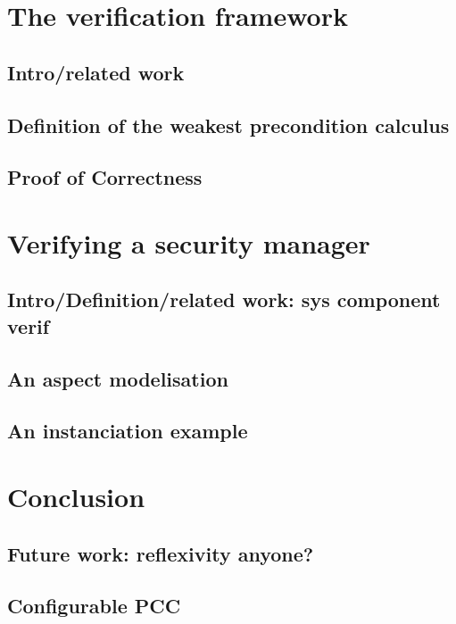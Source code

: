\documentclass[draft]{llncs}
\begin{document}
\section{The verification framework}
\subsection{Intro/related work}
\subsection{Definition of the weakest precondition calculus}
\subsection{Proof of Correctness}
%
\section{Verifying a security manager}
\subsection{Intro/Definition/related work: sys component verif}
\subsection{An aspect modelisation}
\subsection{An instanciation example}
\section{Conclusion}
\subsection{Future work: reflexivity anyone?}
\subsection{Configurable PCC}
%
%
\begin{thebibliography}{}
%


\end{thebibliography}
\end{document}
